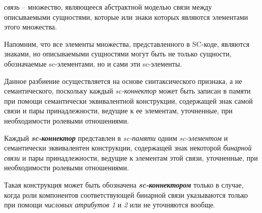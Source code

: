 \textit{связь} -- множество, являющееся абстрактной моделью связи между описываемыми сущностями, которые или знаки которых являются элементами этого множества.
	
Напомним, что все элементы множества, представленного в SC-коде, являются знаками, но описываемыми сущностями могут быть не только сущности, обозначаемые sc-элементами, но и сами эти sc-элементы.
	
\begin{SCn}
\begin{scnsubdividing}
\end{scnsubdividing}

\begin{scnsubdividing}
\end{scnsubdividing}
	
\begin{scnsubdividing}
\end{scnsubdividing}
\end{SCn}

Данное разбиение осуществляется на основе синтаксического признака, а не семантического, поскольку каждый \textit{sc-коннектор} может быть записан в памяти при помощи семантически эквивалентной конструкции, содержащей знак самой связи и пары принадлежности, ведущие к ее элементам, уточненные, при необходимости ролевыми отношениями.
	
\begin{SCn}
\end{SCn}

Каждый \textbf{\textit{sc-коннектор}} представлен в \textit{sc-памяти} одним \textit{sc-элементом} и семантически эквивалентен конструкции, содержащей знак некоторой \textit{бинарной связи} и пары принадлежности, ведущие к элементам этой связи, уточненные, при необходимости ролевыми отношениями.

\begin{SCn}
Такая конструкция может быть обозначена \textbf{\textit{sc-коннектором}} только в случае, когда роли компонентов соответствующей бинарной связи указываются только при помощи \textit{числовых атрибутов 1\scnrolesign} и \textit{2\scnrolesign} или не уточняются вообще.
\end{SCn}
	
\begin{SCn}
\end{SCn}

